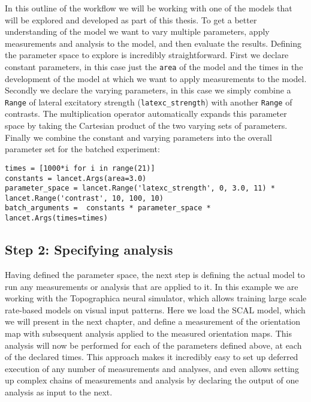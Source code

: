 In this outline of the workflow we will be working with one of the
models that will be explored and developed as part of this thesis. To
get a better understanding of the model we want to vary multiple
parameters, apply measurements and analysis to the model, and then
evaluate the results. Defining the parameter space to explore is
incredibly straightforward. First we declare constant parameters, in
this case just the \texttt{area} of the model and the times in the
development of the model at which we want to apply measurements to the
model. Secondly we declare the varying parameters, in this case we
simply combine a \texttt{Range} of lateral excitatory strength
(\texttt{latexc\_strength}) with another \texttt{Range} of contrasts. The
multiplication operator automatically expands this parameter space by
taking the Cartesian product of the two varying sets of
parameters. Finally we combine the constant and varying parameters
into the overall parameter set for the batched experiment:

\begin{minipage}{\linewidth}
\begin{lstlisting}
times = [1000*i for i in range(21)]
constants = lancet.Args(area=3.0)
parameter_space = lancet.Range('latexc_strength', 0, 3.0, 11) * lancet.Range('contrast', 10, 100, 10)
batch_arguments =  constants * parameter_space * lancet.Args(times=times)
\end{lstlisting}
\end{minipage}

\subsection{Step 2: Specifying analysis}

Having defined the parameter space, the next step is defining the
actual model to run any measurements or analysis that are applied
to it. In this example we are working with the Topographica neural
simulator, which allows training large scale rate-based models on
visual input patterns. Here we load the SCAL model, which we will
present in the next chapter, and define a measurement of the
orientation map with subsequent analysis applied to the measured orientation
maps. This analysis will now be performed for each of the parameters
defined above, at each of the declared times. This approach makes it incredibly
easy to set up deferred execution of any number of measurements and
analyses, and even allows setting up complex chains of measurements and
analysis by declaring the output of one analysis as input to the next.

